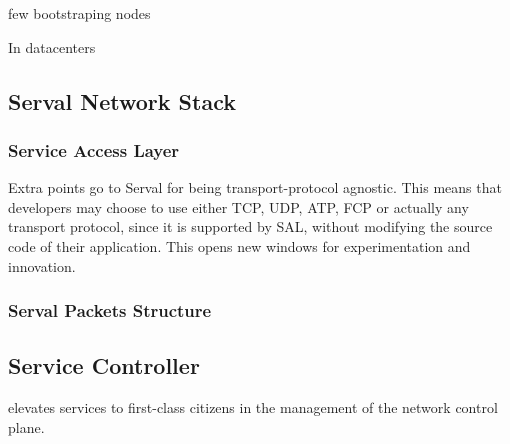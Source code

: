 few bootstraping nodes

In datacenters



\subsection{Serval Network Stack}



\subsubsection{Service Access Layer}
Extra points go to Serval for being transport-protocol agnostic.
This means that developers may choose to use either TCP, UDP, ATP, FCP or actually any transport protocol, since it is supported by SAL, without modifying the source code of their application.
This opens new windows for experimentation and innovation.



\subsubsection{Serval Packets Structure}



\subsection{Service Controller}
elevates services to first-class citizens in the management of the network control plane.




